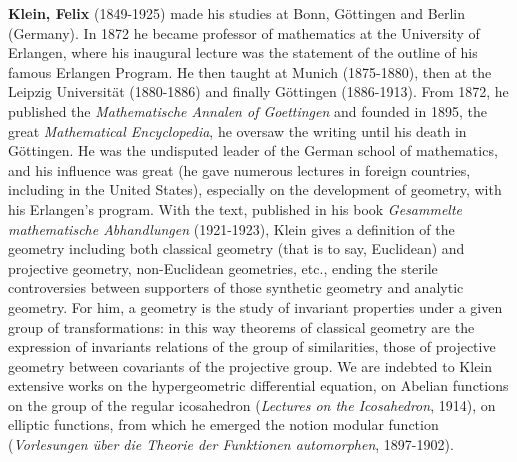 \textbf{Klein, Felix} (1849-1925) made his studies at Bonn, Göttingen and Berlin (Germany). In 1872 he became professor of mathematics at the University of Erlangen, where his inaugural lecture was the statement of the outline of his famous Erlangen Program. He then taught at Munich (1875-1880), then at the Leipzig Universität (1880-1886) and finally Göttingen (1886-1913). From 1872, he published the \textit{Mathematische Annalen of Goettingen} and founded in 1895, the great \textit{Mathematical Encyclopedia}, he oversaw the writing until his death in Göttingen. He was the undisputed leader of the German school of mathematics, and his influence was great (he gave numerous lectures in foreign countries, including in the United States), especially on the development of geometry, with his Erlangen's program. With the text, published in his book\textit{ Gesammelte mathematische Abhandlungen} (1921-1923), Klein gives a definition of the geometry including both classical geometry (that is to say, Euclidean) and projective geometry, non-Euclidean geometries, etc., ending the sterile controversies between supporters of those synthetic geometry and analytic geometry. For him, a geometry is the study of invariant properties under a given group of transformations: in this way theorems of classical geometry are the expression of invariants relations of the group of similarities, those of projective geometry between covariants of the projective group. We are indebted to Klein extensive works on the hypergeometric differential equation, on Abelian functions on the group of the regular icosahedron (\textit{Lectures on the Icosahedron}, 1914), on elliptic functions, from which he emerged the notion modular function (\textit{Vorlesungen über die Theorie der Funktionen automorphen}, 1897-1902).

